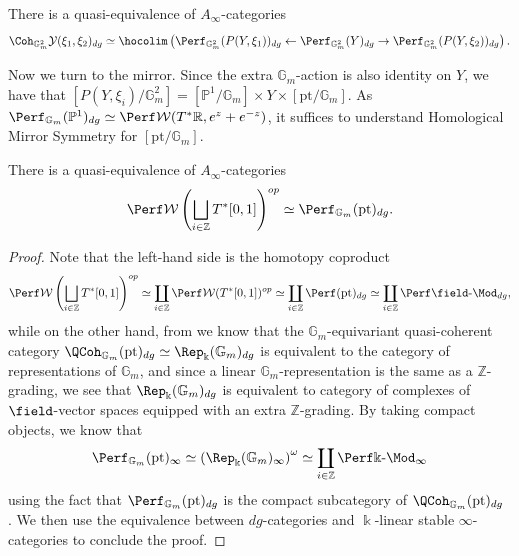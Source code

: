 \begin{prp}\label{prp:pushforward-coherent-stack}
    There is a quasi-equivalence of $A_{\infty}$-categories \[
        \Coh_{\mathbb{G}_m^2}\mathcal{Y} (\xi_1,\xi_2)_{dg}\simeq\hocolim\left(\Perf_{\mathbb{G}_m^2} (P(Y,\xi_1))_{dg}\leftarrow\Perf_{\mathbb{G}_m^2} (Y)_{dg}\rightarrow\Perf_{\mathbb{G}_m^2} (P(Y,\xi_2))_{dg}\right).
    \]
\end{prp}
Now we turn to the mirror. Since the extra $\mathbb{G}_m$-action is also identity on $Y$, we have that $[P(Y,\xi_i)/\mathbb{G}_m^2]=[\mathbb{P}^1/\mathbb{G}_m]\times Y\times [\mathrm{pt}/\mathbb{G}_m]$. As $\Perf_{\mathbb{G}_m} (\mathbb{P}^1)_{dg}\simeq\Perf\mathcal{W} (T^{\ast}\mathbb{R},e^z+e^{-z})$, it suffices to understand Homological Mirror Symmetry for $[\mathrm{pt}/\mathbb{G}_m]$.
\begin{lmm}
    There is a quasi-equivalence of $A_{\infty}$-categories \[
        \Perf\mathcal{W}\left(\bigsqcup_{i\in\mathbb{Z}}T^{\ast}[0,1]\right)^{op}\simeq\Perf_{\mathbb{G}_m} (\mathrm{pt})_{dg}.
    \]
\end{lmm}
\begin{proof}
    Note that the left-hand side is the homotopy coproduct \[
       \Perf \mathcal{W}\left(\bigsqcup_{i\in\mathbb{Z}}T^{\ast} [0,1]\right)^{op}\simeq\coprod_{i\in\mathbb{Z}}\Perf\mathcal{W} (T^{\ast} [0,1])^{op}\simeq \coprod_{i\in\mathbb{Z}}\Perf (\mathrm{pt})_{dg}\simeq\coprod_{i\in\mathbb{Z}}\Perf\field\text{-}\Mod_{dg},
    \]while on the other hand, from \cite[Proposition 4.9]{TV18} we know that the $\mathbb{G}_m$-equivariant quasi-coherent category $\QCoh_{\mathbb{G}_m} (\mathrm{pt})_{dg}\simeq\Rep_{\Bbbk} (\mathbb{G}_m)_{dg}$ is equivalent to the category of representations of $\mathbb{G}_m$, and since a linear $\mathbb{G}_m$-representation is the same as a $\mathbb{Z}$-grading, we see that $\Rep_{\Bbbk} (\mathbb{G}_m)_{dg}$ is equivalent to category of complexes of $\field$-vector spaces equipped with an extra $\mathbb{Z}$-grading. By taking compact objects, we know that \[
        \Perf_{\mathbb{G}_m} (\mathrm{pt})_{\infty}\simeq\left(\Rep_{\Bbbk} (\mathbb{G}_m)_{\infty}\right)^{\omega}\simeq\coprod_{i\in\mathbb{Z}}\Perf\Bbbk\text{-}\Mod_{\infty}
    \]using the fact that $\Perf_{\mathbb{G}_m} (\mathrm{pt})_{dg}$ is the compact subcategory of $\QCoh_{\mathbb{G}_m} (\mathrm{pt})_{dg}$ \cite{BZFN10}. We then use the equivalence between $dg$-categories and $\Bbbk$-linear stable $\infty$-categories \cite{Cohn16} to conclude the proof.
\end{proof}
